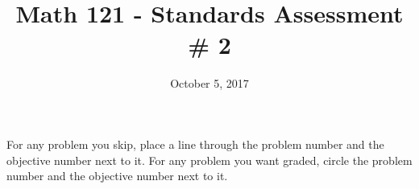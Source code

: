 \documentclass{exam}
\title{Math 121 - Standards Assessment \# 2}
\date{October 5, 2017}
\begin{document}
\maketitle
\bigskip

\begin{center}
\large
    For any problem you skip, place a line through the problem number and the objective number next to it. For any problem you want graded, circle the problem number and the objective number next to it.
\end{center}
\normalsize

\maketitle
\end{document}
